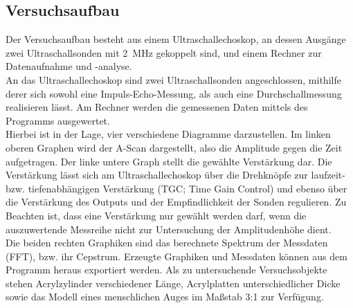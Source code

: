 \subsection{Versuchsaufbau}
\label{sec:Versuchsaufbau}
Der Versuchsaufbau besteht aus einem Ultraschallechoskop, an dessen Ausgänge zwei Ultraschallsonden mit \SI{2}{\mega\Hz} gekoppelt sind, und einem Rechner zur Datenaufnahme und -analyse.\\
An das Ultraschallechoskop sind zwei Ultraschallsonden angeschlossen, mithilfe derer sich sowohl eine Impuls-Echo-Messung, als auch eine Durchschallmessung realisieren lässt.
Am Rechner werden die gemessenen Daten mittels des Programms  ausgewertet.\\
Hierbei ist  in der Lage, vier verschiedene Diagramme darzustellen.
Im linken oberen Graphen wird der A-Scan dargestellt, also die Amplitude gegen die Zeit aufgetragen.
Der linke untere Graph stellt die gewählte Verstärkung dar. Die Verstärkung lässt sich am Ultraschallechoskop über die Drehknöpfe zur laufzeit-bzw. tiefenabhängigen Verstärkung (TGC; Time Gain Control) und ebenso über die Verstärkung des Outputs und der Empfindlichkeit der Sonden regulieren.
Zu Beachten ist, dass eine Verstärkung nur gewählt werden darf, wenn die auszuwertende Messreihe nicht zur Untersuchung der Amplitudenhöhe dient.\\
Die beiden rechten Graphiken sind das berechnete Spektrum der Messdaten (FFT), bzw. ihr
Cepstrum.
Erzeugte Graphiken und Messdaten können aus dem Programm heraus exportiert werden.
Als zu untersuchende Versuchsobjekte stehen Acrylzylinder verschiedener Länge, Acrylplatten unterschiedlicher Dicke sowie das Modell eines menschlichen Auges im Maßstab 3:1 zur Verfügung.
